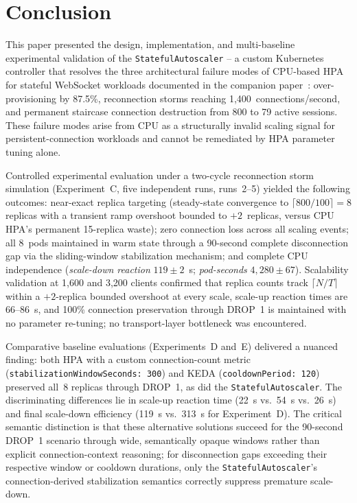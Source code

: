 \documentclass[twocolumn]{svjour3}
\begin{document}
\section{Conclusion}
\label{sec:conclusion}

This paper presented the design, implementation, and multi-baseline experimental validation
of the \texttt{StatefulAutoscaler} -- a custom Kubernetes controller that resolves the three
architectural failure modes of CPU-based HPA for stateful WebSocket workloads documented
in the companion paper~\cite{behera2026hpa}: over-provisioning by 87.5\%, reconnection
storms reaching 1,400~connections/second, and permanent staircase connection destruction
from 800 to 79 active sessions. These failure modes arise from CPU as a structurally invalid
scaling signal for persistent-connection workloads and cannot be remediated by HPA
parameter tuning alone.

Controlled experimental evaluation under a two-cycle reconnection storm simulation
(Experiment~C, five independent runs, runs~2--5) yielded the following outcomes:
near-exact replica targeting (steady-state convergence to $\lceil800/100\rceil = 8$
replicas with a transient ramp overshoot bounded to $+2$~replicas, versus CPU HPA's
permanent 15-replica waste); zero connection loss across all scaling events; all 8~pods
maintained in warm state through a 90-second complete disconnection gap via the
sliding-window stabilization mechanism; and complete CPU independence
(\textit{scale-down reaction} $119 \pm 2$~s; \textit{pod-seconds} $4{,}280 \pm 67$).
Scalability validation at 1{,}600 and 3{,}200 clients confirmed that replica counts track
$\lceil N/T \rceil$ within a $+2$-replica bounded overshoot at every scale, scale-up
reaction times are 66--86~s, and 100\% connection preservation through DROP~1 is
maintained with no parameter re-tuning; no transport-layer bottleneck was encountered.

Comparative baseline evaluations (Experiments~D and~E) delivered a nuanced finding: both
HPA with a custom connection-count metric (\texttt{stabilizationWindowSeconds:~300}) and
KEDA (\texttt{cooldownPeriod:~120}) preserved all~8 replicas through DROP~1, as did the
\texttt{StatefulAutoscaler}. The discriminating differences lie in scale-up reaction time (22~s
vs.\ 54~s vs.\ 26~s) and final scale-down efficiency (119~s vs.\ 313~s for Experiment~D). The
critical semantic distinction is that these alternative solutions succeed for the 90-second
DROP~1 scenario through wide, semantically opaque windows rather than explicit
connection-context reasoning; for disconnection gaps exceeding their respective window or
cooldown durations, only the \texttt{StatefulAutoscaler}'s connection-derived stabilization
semantics correctly suppress premature scale-down.
\end{document}
